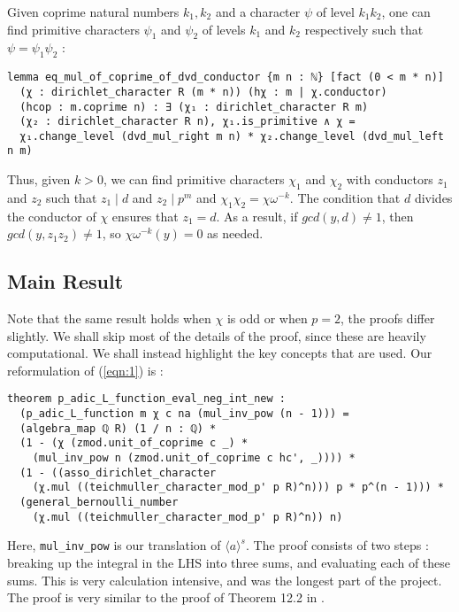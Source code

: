 \documentclass[a4paper,UKenglish,cleveref, autoref, thm-restate,pdfa]{lipics-v2021}
\newcommand{\lean}[1]{\texttt{#1}\xspace} %
\begin{document}
Given coprime natural numbers $k_1, k_2$ and a character $\psi$ of level $k_1 k_2$, one can find primitive characters 
$\psi_1$ and $\psi_2$ of levels $k_1$ and $k_2$ respectively such that $\psi = \psi_1 \psi_2$ : 
\begin{lstlisting}
lemma eq_mul_of_coprime_of_dvd_conductor {m n : ℕ} [fact (0 < m * n)] 
  (χ : dirichlet_character R (m * n)) (hχ : m | χ.conductor) 
  (hcop : m.coprime n) : ∃ (χ₁ : dirichlet_character R m) 
  (χ₂ : dirichlet_character R n), χ₁.is_primitive ∧ χ = 
  χ₁.change_level (dvd_mul_right m n) * χ₂.change_level (dvd_mul_left n m) 
\end{lstlisting}
Thus, given $k > 0$, we can find primitive characters $\chi_1$ and $\chi_2$ with conductors $z_1$ and $z_2$ such that 
$z_1 \mid d$ and $z_2 \mid p^m$ and $\chi_1 \chi_2 = \chi \omega^{-k}$. The condition that $d$ divides the conductor of $\chi$ ensures 
that $z_1 = d$. As a result, if $gcd (y, d) \ne 1$, then $gcd (y, z_1 z_2) \ne 1$, so $\chi \omega^{-k} (y) = 0$ as needed.

\subsection{Main Result}
Note that the same result holds when $\chi$ is odd or when $p = 2$, the proofs differ slightly. We shall 
skip most of the details of the proof, since these are heavily computational. We shall instead highlight the key concepts 
that are used. Our reformulation of (\ref{eqn:1}) is :
\begin{lstlisting}
theorem p_adic_L_function_eval_neg_int_new :
  (p_adic_L_function m χ c na (mul_inv_pow (n - 1))) = 
  (algebra_map ℚ R) (1 / n : ℚ) *
  (1 - (χ (zmod.unit_of_coprime c _) * 
    (mul_inv_pow n (zmod.unit_of_coprime c hc', _)))) * 
  (1 - ((asso_dirichlet_character 
    (χ.mul ((teichmuller_character_mod_p' p R)^n))) p * p^(n - 1))) * 
  (general_bernoulli_number 
    (χ.mul ((teichmuller_character_mod_p' p R)^n)) n) 
\end{lstlisting}
Here, \lean{mul\_inv\_pow} is our translation of $\langle a \rangle ^s$. \newline
The proof consists of two steps : breaking up the integral in the LHS into three sums, 
and evaluating each of these sums. This is very calculation intensive, and was the longest part of the project. 
The proof is very similar to the proof of Theorem 12.2 in \cite{cyc}. 
\end{document}

